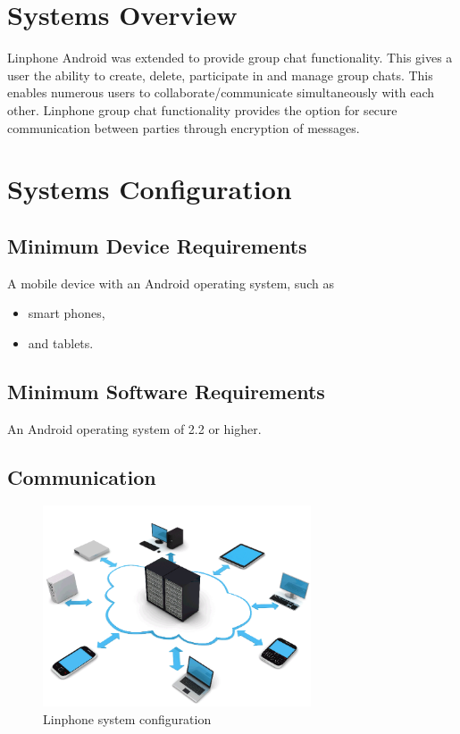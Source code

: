 \documentclass[11pt]{article}
\begin{document}


\setcounter{tocdepth}{3}
\setcounter{secnumdepth}{5}
\tableofcontents

\newpage
\section{Systems Overview} 
Linphone Android was extended to provide group chat functionality. This gives a user the ability to create, delete, participate in and manage group chats. This enables numerous users to collaborate/communicate simultaneously with each other. Linphone group chat functionality provides the option for secure communication between parties through encryption of messages.

\section{Systems Configuration}
\subsection{Minimum Device Requirements}
A mobile device with an Android operating system, such as
\begin{itemize}
\item smart phones,
\item and tablets.
\end{itemize}
\subsection{Minimum Software Requirements}
An Android operating system of 2.2 or higher.\\

\subsection{Communication}
\begin{figure}[H]
\includegraphics[width=300px]{./images/network.png}
\caption{Linphone system configuration}
\label{Configuration}
\end{figure}
\end{document}
